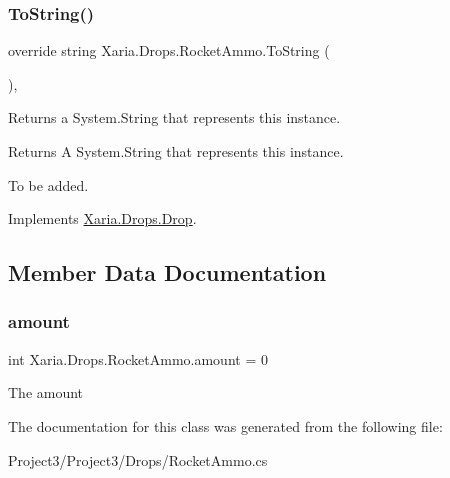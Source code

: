 \subsubsection{\texorpdfstring{To\+String()}{ToString()}}
{\footnotesize\ttfamily override string Xaria.\+Drops.\+Rocket\+Ammo.\+To\+String (\begin{DoxyParamCaption}{ }\end{DoxyParamCaption})\hspace{0.3cm}{\ttfamily [inline]}, {\ttfamily [virtual]}}



Returns a System.\+String that represents this instance. 

\begin{DoxyReturn}{Returns}
A System.\+String that represents this instance. 
\end{DoxyReturn}


To be added. 

Implements \hyperlink{classXaria_1_1Drops_1_1Drop_abe25441e5c3fe5b2199352f24bfafa4b}{Xaria.\+Drops.\+Drop}.



\subsection{Member Data Documentation}
\mbox{\label{classXaria_1_1Drops_1_1RocketAmmo_aaf708cc2d62762d36959ab4a11cdbc1e}} 
\subsubsection{\texorpdfstring{amount}{amount}}
{\footnotesize\ttfamily int Xaria.\+Drops.\+Rocket\+Ammo.\+amount = 0}



The amount 



The documentation for this class was generated from the following file\+:\begin{DoxyCompactItemize}
\item 
Project3/\+Project3/\+Drops/Rocket\+Ammo.\+cs\end{DoxyCompactItemize}

